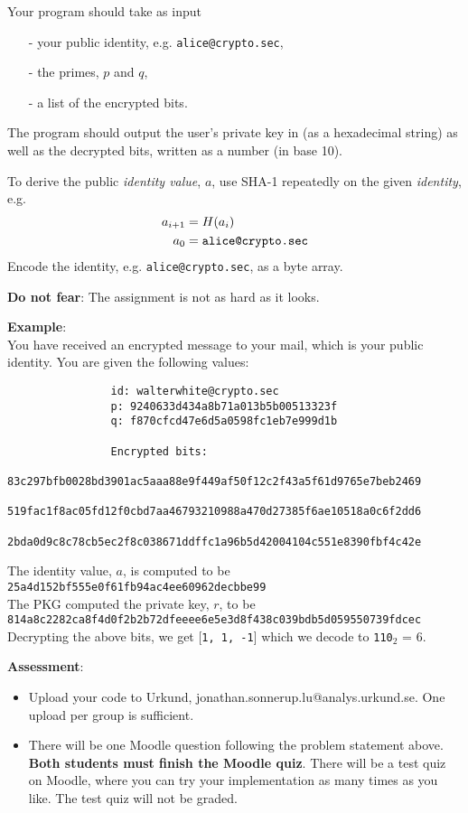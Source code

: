 \documentclass{article}
\begin{document}
\begin{description}
{				Your program should take as input
				\begin{itemize}
					\item[-] your public identity, e.g. \texttt{alice@crypto.sec},
					\item[-] the primes, $p$ and $q$,
					\item[-] a list of the encrypted bits.
				\end{itemize}
				The program should output the user's private key in (as a hexadecimal string) as well as the decrypted bits, written as a number (in base 10).
				
				To derive the public \emph{identity value}, $a$, use SHA-1 repeatedly on the given \emph{identity}, e.g.
				\begin{align*}
				a_{i+1} &= H(a_i) \\
				a_0 &= \text{\texttt{alice@crypto.sec}}
				\end{align*}
				Encode the identity, e.g. \texttt{alice@crypto.sec}, as a byte array.
				
				\textbf{Do not fear}: The assignment is not as hard as it looks.
				
				\textbf{Example}:\\
				You have received an encrypted message to your mail, which is your public identity.
				You are given the following values:
				\begin{verbatim}
				id: walterwhite@crypto.sec
				p: 9240633d434a8b71a013b5b00513323f
				q: f870cfcd47e6d5a0598fc1eb7e999d1b
				
				Encrypted bits:
				83c297bfb0028bd3901ac5aaa88e9f449af50f12c2f43a5f61d9765e7beb2469
				519fac1f8ac05fd12f0cbd7aa46793210988a470d27385f6ae10518a0c6f2dd6
				2bda0d9c8c78cb5ec2f8c038671ddffc1a96b5d42004104c551e8390fbf4c42e
				\end{verbatim}
				The identity value, $a$, is computed to be\\
				\texttt{25a4d152bf555e0f61fb94ac4ee60962decbbe99}\\
				The PKG computed the private key, $r$, to be\\
				\texttt{814a8c2282ca8f4d0f2b2b72dfeeee6e5e3d8f438c039bdb5d059550739fdcec}\\
				Decrypting the above bits, we get [\texttt{1, 1, -1}] which we decode to \texttt{110}$_2$ = $6$.

				
			
				
				\textbf{Assessment}:
				\begin{itemize}
					\item Upload your code to Urkund, jonathan.sonnerup.lu@analys.urkund.se.
					One upload per group is sufficient.
					
					\item There will be one Moodle question following the problem statement above. 
					\textbf{Both students must finish the Moodle quiz}.
					There will be a test quiz on Moodle, where you can try your implementation as many times as you like. 
					The test quiz will not be graded.
				\end{itemize}
			}
			
		\end{description}
		
	
\end{document}
